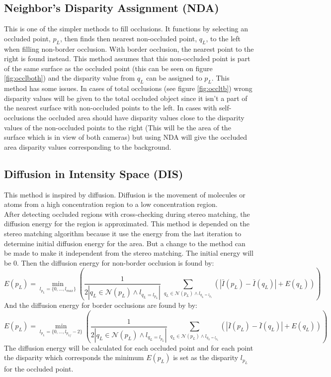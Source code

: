 \subsection{Neighbor's Disparity Assignment (NDA)}\label{sec:nda}
This is one of the simpler methods to fill occlusions. It functions by selecting an occluded point, $p_L$, then finds then nearest non-occluded point, $q_L$, to the left when filling non-border occlusion. With border occlusion, the nearest point to the right is found instead. This method assumes that this non-occluded point is part of the same surface as the occluded point (this can be seen on figure \ref{fig:occlboth}) and the disparity value from $q_L$ can be assigned to $p_L$. This method has some issues. In cases of total occlusions (see figure \ref{fig:occltb}) wrong disparity values will be given to the total occluded object since it isn't a part of the nearest surface with non-occluded points to the left. In cases with self-occlusions the occluded area should have disparity values close to the disparity values of the non-occluded points to the right (This will be the area of the surface which is in view of both cameras) but using NDA will give the occluded area disparity values corresponding to the background.

\subsection{Diffusion in Intensity Space (DIS)}
This method is inspired by diffusion. Diffusion is the movement of molecules or atoms from a high concentration region to a low concentration region. \\

After detecting occluded regions with cross-checking during stereo matching, the diffusion energy for the region is approximated. This method is depended on the stereo matching algorithm because it use the energy from the last iteration to determine initial diffusion energy for the area. But a change to the method can be made to make it independent from the stereo matching. The initial energy will be 0. Then the diffusion energy for non-border occlusion is found by:
\begin{equation}
E(p_L) = \min_{l_{p_L}=\{0,\dots, l_{max}\}} \left( \dfrac{1}{2 | q_L \in \mathcal{N}(p_L) \wedge l_{q_L=l_{p_L}} |} \; \sum_{q_L \in \mathcal{N}(p_L) \wedge l_{q_L = l_{p_L}}} (|\bar{I}(p_L)-\bar{I}(q_L) | + E(q_L))\right)
\end{equation}
And the diffusion energy for border occlusions are found by by:
\begin{equation}
E(p_L) = \min_{l_{p_L}=\{0,\dots, l_{p_{Lf}}-2\}} \left( \dfrac{1}{2 | q_L \in \mathcal{N}(p_L) \wedge l_{q_L=l_{p_L}} |} \; \sum_{q_L \in \mathcal{N}(p_L) \wedge l_{q_L = l_{p_L}}} (|\bar{I}(p_L)-\bar{I}(q_L) | + E(q_L))\right)
\end{equation}
The diffusion energy will be calculated for each occluded point and for each point the disparity which corresponds the minimum $E(p_L)$ is set as the disparity $l_{p_L}$ for the occluded point.

